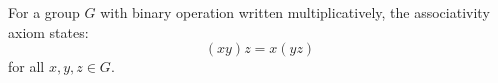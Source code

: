 For a group $G$ with binary operation written multiplicatively, the associativity axiom states:
$$(xy)z = x(yz)$$
for all $x, y, z \in G$.
